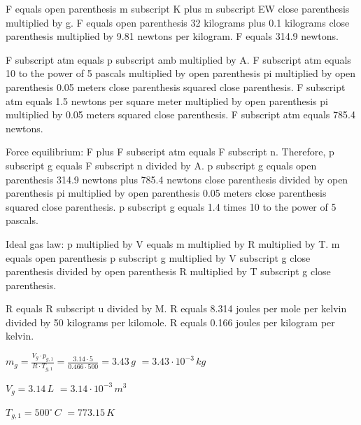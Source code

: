 F equals open parenthesis m subscript K plus m subscript EW close parenthesis multiplied by g.  
F equals open parenthesis 32 kilograms plus 0.1 kilograms close parenthesis multiplied by 9.81 newtons per kilogram.  
F equals 314.9 newtons.  

F subscript atm equals p subscript amb multiplied by A.  
F subscript atm equals 10 to the power of 5 pascals multiplied by open parenthesis pi multiplied by open parenthesis 0.05 meters close parenthesis squared close parenthesis.  
F subscript atm equals 1.5 newtons per square meter multiplied by open parenthesis pi multiplied by 0.05 meters squared close parenthesis.  
F subscript atm equals 785.4 newtons.  

Force equilibrium:  
F plus F subscript atm equals F subscript n.  
Therefore, p subscript g equals F subscript n divided by A.  
p subscript g equals open parenthesis 314.9 newtons plus 785.4 newtons close parenthesis divided by open parenthesis pi multiplied by open parenthesis 0.05 meters close parenthesis squared close parenthesis.  
p subscript g equals 1.4 times 10 to the power of 5 pascals.  

Ideal gas law:  
p multiplied by V equals m multiplied by R multiplied by T.  
m equals open parenthesis p subscript g multiplied by V subscript g close parenthesis divided by open parenthesis R multiplied by T subscript g close parenthesis.  

R equals R subscript u divided by M.  
R equals 8.314 joules per mole per kelvin divided by 50 kilograms per kilomole.  
R equals 0.166 joules per kilogram per kelvin.

\( m_g = \frac{V_g \cdot p_{g,1}}{R \cdot T_{g,1}} = \frac{3.14 \cdot 5}{0.466 \cdot 500} = 3.43 \, g \)  
\( = 3.43 \cdot 10^{-3} \, kg \)  

\( V_g = 3.14 \, L \)  
\( = 3.14 \cdot 10^{-3} \, m^3 \)  

\( T_{g,1} = 500^\circ \, C \)  
\( = 773.15 \, K \)